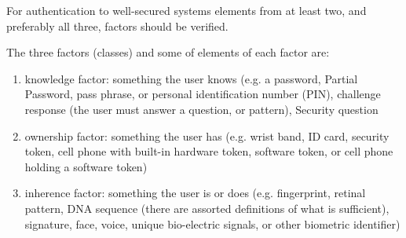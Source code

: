 For authentication to well-secured systems elements from at least two, and preferably all three, factors should be verified.

The three factors (classes) and some of elements of each factor are:

\begin{enumerate}

    \item knowledge factor: something the user knows (e.g. a password, Partial Password, pass phrase, or personal identification number (PIN), challenge response (the user must answer a question, or pattern), Security question

    \item ownership factor: something the user has (e.g. wrist band, ID card, security token, cell phone with built-in hardware token, software token, or cell phone holding a software token)

    \item inherence factor: something the user is or does (e.g. fingerprint, retinal pattern, DNA sequence (there are assorted definitions of what is sufficient), signature, face, voice, unique bio-electric signals, or other biometric identifier)

\end{enumerate}




